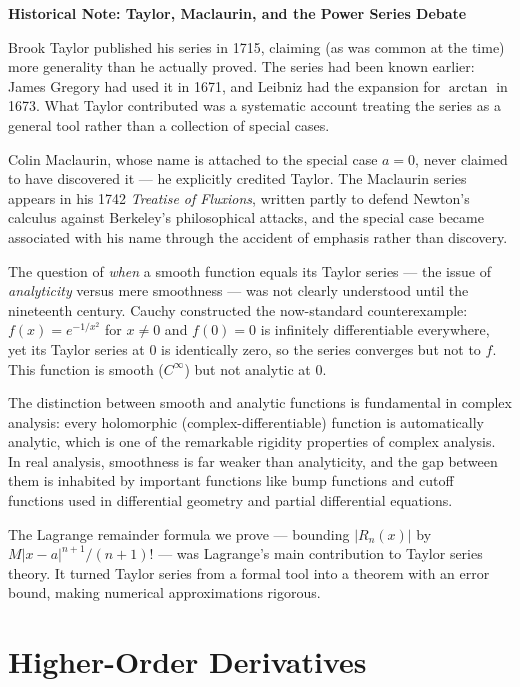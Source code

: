 \documentclass[12pt, openany]{book}
\theoremstyle{plain}
\theoremstyle{definition}
\theoremstyle{remark}
\begin{document}
\begin{remarkbox}
\textbf{Historical Note: Taylor, Maclaurin, and the Power Series Debate}

Brook Taylor published his series in 1715, claiming (as was common at the time) more generality than he actually proved. The series had been known earlier: James Gregory had used it in 1671, and Leibniz had the expansion for $\arctan$ in 1673. What Taylor contributed was a systematic account treating the series as a general tool rather than a collection of special cases.

Colin Maclaurin, whose name is attached to the special case $a = 0$, never claimed to have discovered it --- he explicitly credited Taylor. The Maclaurin series appears in his 1742 \emph{Treatise of Fluxions}, written partly to defend Newton's calculus against Berkeley's philosophical attacks, and the special case became associated with his name through the accident of emphasis rather than discovery.

The question of \emph{when} a smooth function equals its Taylor series --- the issue of \emph{analyticity} versus mere smoothness --- was not clearly understood until the nineteenth century. Cauchy constructed the now-standard counterexample: $f(x) = e^{-1/x^2}$ for $x \neq 0$ and $f(0) = 0$ is infinitely differentiable everywhere, yet its Taylor series at $0$ is identically zero, so the series converges but not to $f$. This function is smooth ($C^\infty$) but not analytic at $0$.

The distinction between smooth and analytic functions is fundamental in complex analysis: every holomorphic (complex-differentiable) function is automatically analytic, which is one of the remarkable rigidity properties of complex analysis. In real analysis, smoothness is far weaker than analyticity, and the gap between them is inhabited by important functions like bump functions and cutoff functions used in differential geometry and partial differential equations.

The Lagrange remainder formula we prove --- bounding $|R_n(x)|$ by $M|x-a|^{n+1}/(n+1)!$ --- was Lagrange's main contribution to Taylor series theory. It turned Taylor series from a formal tool into a theorem with an error bound, making numerical approximations rigorous.
\end{remarkbox}
\color{black}

\section{Higher-Order Derivatives}
\end{document}
